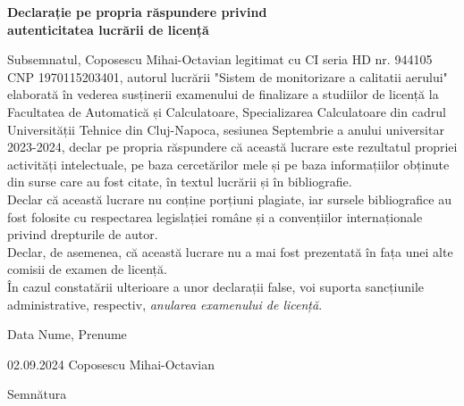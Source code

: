 \begin{center}
	{\bf Declarație pe propria răspundere privind\\ 
		autenticitatea lucrării de licență}
\end{center}
\vspace{1cm}

\begin{minipage}{\linewidth}
	\indent Subsemnatul, Coposescu Mihai-Octavian %
	legitimat cu CI %
	seria HD %
	nr. 944105 %
	CNP 1970115203401, %
	autorul lucrării "Sistem de monitorizare a calitatii aerului"
	elaborată în vederea susținerii examenului de finalizare a studiilor de licență la Facultatea de Automatică și Calculatoare, Specializarea Calculatoare %
	din cadrul Universității Tehnice din Cluj-Napoca, sesiunea Septembrie %
	a anului universitar 2023-2024, %
	declar pe propria răspundere că această lucrare este rezultatul propriei activități intelectuale, pe baza cercetărilor mele și pe baza informațiilor obținute din surse care au fost citate, în textul lucrării și în bibliografie.\\
	\hspace*{8mm} Declar că această lucrare nu conține porțiuni plagiate, iar sursele bibliografice au fost folosite cu respectarea legislației române și a convențiilor internaționale privind drepturile de autor.\\
	\hspace*{8mm} Declar, de asemenea, că această lucrare nu a mai fost prezentată în fața unei alte comisii de examen de licență.\\
	\hspace*{8mm} În cazul constatării ulterioare a unor declarații false, voi suporta sancțiunile administrative, respectiv, \emph{anularea examenului de licență}.
\end{minipage}
\vspace{1.5cm}

Data \hspace{8cm} Nume, Prenume

\vspace{0.5cm}

02.09.2024 \hspace{5cm} Coposescu Mihai-Octavian

\vspace{1cm}
\hspace{9.4cm}Semnătura
\newpage
